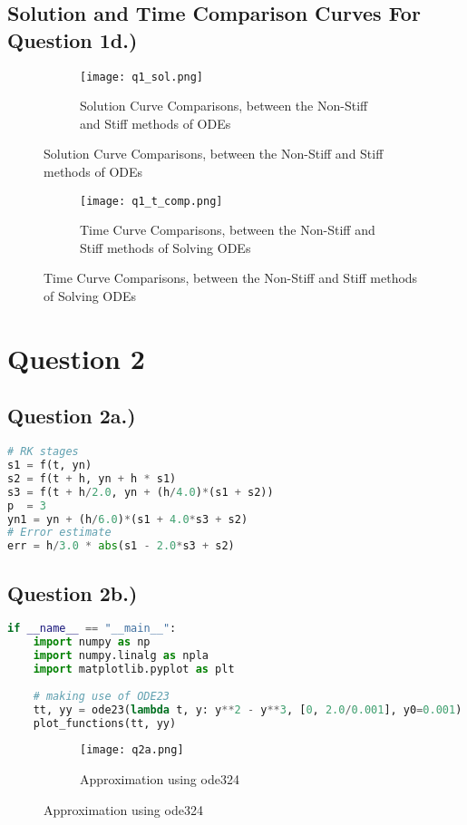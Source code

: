 \documentclass{article}
\begin{document}
\subsection*{Solution and Time Comparison Curves For Question 1d.)}
\begin{figure}[h!]
  \centering
  \begin{subfigure}{\linewidth}
    \texttt{[image: q1\_sol.png]}
    \caption{Solution Curve Comparisons, between the Non-Stiff and Stiff methods of ODEs}
  \end{subfigure}
\end{figure}
\begin{figure}[h!]
  \centering
  \begin{subfigure}{\linewidth}
    \texttt{[image: q1\_t\_comp.png]}
    \caption{Time Curve Comparisons, between the Non-Stiff and Stiff methods of Solving ODEs}
  \end{subfigure}
\end{figure}


\pagebreak
\section*{Question 2}
\subsection*{Question 2a.)}
\begin{lstlisting}[language=Python]
# RK stages
s1 = f(t, yn)
s2 = f(t + h, yn + h * s1)
s3 = f(t + h/2.0, yn + (h/4.0)*(s1 + s2))
p  = 3
yn1 = yn + (h/6.0)*(s1 + 4.0*s3 + s2)
# Error estimate
err = h/3.0 * abs(s1 - 2.0*s3 + s2)           
\end{lstlisting}
\subsection*{Question 2b.)}
\begin{lstlisting}[language=Python]
if __name__ == "__main__":
    import numpy as np
    import numpy.linalg as npla
    import matplotlib.pyplot as plt
    
    # making use of ODE23
    tt, yy = ode23(lambda t, y: y**2 - y**3, [0, 2.0/0.001], y0=0.001)
    plot_functions(tt, yy)
\end{lstlisting}

\begin{figure}[h!]
  \centering
  \begin{subfigure}{\linewidth}
    \texttt{[image: q2a.png]}
    \caption{Approximation using ode324}
  \end{subfigure}
\end{figure}
\pagebreak
\end{document}
